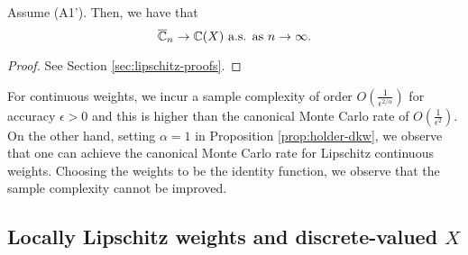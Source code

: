 \begin{proposition}
\label{prop:lipschitz}
Assume (A1'). Then, we have that 
$$\overline {\mathbb{C}}_n
\rightarrow
\mathbb{C}(X)
 \text{   a.s. as } n\rightarrow \infty.
$$
\end{proposition}

\begin{proof}
See Section \ref{sec:lipschitz-proofs}.
\end{proof}

\begin{remark}
 For \holder continuous weights, we incur a sample complexity of order $O\left(\frac1{\epsilon^{2/\alpha}}\right)$ for accuracy $\epsilon>0$ and this is higher than the canonical Monte Carlo rate of $O\left(\frac1{\epsilon^2}\right)$. On the other hand, setting $\alpha=1$ in Proposition \ref{prop:holder-dkw}, we observe that one can achieve the canonical Monte Carlo rate for Lipschitz continuous weights. Choosing the weights to be the identity function, we observe that the sample complexity cannot be improved.
\end{remark}

\subsection{Locally Lipschitz weights and discrete-valued $X$}

